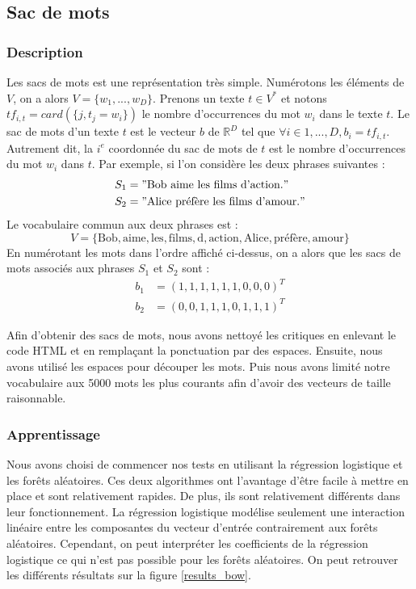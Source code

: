 \documentclass{article}
\begin{document}
\subsection{Sac de mots}

\subsubsection{Description}

Les sacs de mots \cite{Salton:1986:IMI:576628} est une représentation très simple. Numérotons les éléments de $V$, on a alors $V=\{w_{1}, ..., w_{D}\}$. Prenons un texte $t \in V^{*}$ et notons $tf_{i,t} = card(\{j, t_{j}=w_{i}\})$ le nombre d’occurrences du mot $w_{i}$ dans le texte $t$. Le sac de mots d'un texte $t$ est le vecteur $b$ de $\mathbb{R}^{D}$ tel que $\forall i \in {1, ..., D}, b_{i} = tf_{i,t}$. Autrement dit, la $i^{e}$ coordonnée du sac de mots de $t$ est le nombre d’occurrences du mot $w_{i}$ dans $t$. Par exemple, si l'on considère les deux phrases suivantes :
\begin{align*}
S_{1} & = "\text{Bob aime les films d'action.}" \\
S_{2} & = "\text{Alice préfère les films d'amour.}"
\end{align*}
Le vocabulaire commun aux deux phrases est :
$$
V = \{\text{Bob}, \text{aime}, \text{les}, \text{films}, \text{d}, \text{action}, \text{Alice}, \text{préfère}, \text{amour}\}
$$
En numérotant les mots dans l'ordre affiché ci-dessus, on a alors que les sacs de mots associés aux phrases $S_{1}$ et $S_{2}$ sont :
\begin{align*}
b_{1} & = (1, 1, 1, 1, 1, 1, 0, 0, 0)^{T} \\
b_{2} & = (0, 0, 1, 1, 1, 0, 1, 1, 1)^{T}
\end{align*}

Afin d'obtenir des sacs de mots, nous avons nettoyé les critiques en enlevant le code HTML et en remplaçant la ponctuation par des espaces. Ensuite, nous avons utilisé les espaces pour découper les mots. Puis nous avons limité notre vocabulaire aux 5000 mots les plus courants afin d'avoir des vecteurs de taille raisonnable.

\subsubsection{Apprentissage}

Nous avons choisi de commencer nos tests en utilisant la régression logistique et les forêts aléatoires. Ces deux algorithmes ont l'avantage d'être facile à mettre en place et sont relativement rapides. De plus, ils sont relativement différents dans leur fonctionnement. La régression logistique modélise seulement une interaction linéaire entre les composantes du vecteur d'entrée contrairement aux forêts aléatoires. Cependant, on peut interpréter les coefficients de la régression logistique ce qui n'est pas possible pour les forêts aléatoires. On peut retrouver les différents résultats sur la figure \ref{results_bow}.
\end{document}
